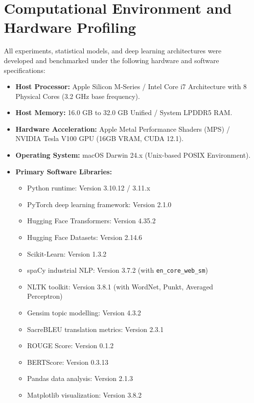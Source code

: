 \documentclass[12pt,a4paper]{report}
\begin{document}
\chapter{Computational Environment and Hardware Profiling}
All experiments, statistical models, and deep learning architectures were developed and benchmarked under the following hardware and software specifications:
\begin{itemize}
    \item \textbf{Host Processor:} Apple Silicon M-Series / Intel Core i7 Architecture with 8 Physical Cores (3.2 GHz base frequency).
    \item \textbf{Host Memory:} 16.0 GB to 32.0 GB Unified / System LPDDR5 RAM.
    \item \textbf{Hardware Acceleration:} Apple Metal Performance Shaders (MPS) / NVIDIA Tesla V100 GPU (16GB VRAM, CUDA 12.1).
    \item \textbf{Operating System:} macOS Darwin 24.x (Unix-based POSIX Environment).
    \item \textbf{Primary Software Libraries:}
    \begin{itemize}
        \item Python runtime: Version 3.10.12 / 3.11.x
        \item PyTorch deep learning framework: Version 2.1.0
        \item Hugging Face Transformers: Version 4.35.2
        \item Hugging Face Datasets: Version 2.14.6
        \item Scikit-Learn: Version 1.3.2
        \item spaCy industrial NLP: Version 3.7.2 (with \texttt{en\_core\_web\_sm})
        \item NLTK toolkit: Version 3.8.1 (with WordNet, Punkt, Averaged Perceptron)
        \item Gensim topic modelling: Version 4.3.2
        \item SacreBLEU translation metrics: Version 2.3.1
        \item ROUGE Score: Version 0.1.2
        \item BERTScore: Version 0.3.13
        \item Pandas data analysis: Version 2.1.3
        \item Matplotlib visualization: Version 3.8.2
    \end{itemize}
\end{itemize}
\end{document}
